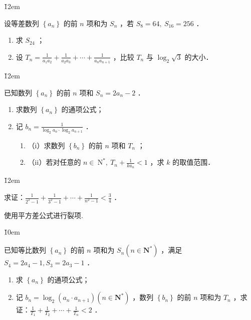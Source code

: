 \v{12em}

\begin{example}
    设等差数列 $\left\{a_n\right\}$ 的前 $n$ 项和为 $S_n$ ，若 $S_8=64, ~ S_{16}=256$ ．
    \begin{enumerate}
        \item 求 $S_{24}$ ；
        \item 设 $T_n=\frac{1}{a_1 a_2}+\frac{1}{a_2 a_3}+\cdots+\frac{1}{a_n a_{n+1}}$ ，比较 $T_n$ 与 $\log _2 \sqrt{3}$ 的大小．
    \end{enumerate}
\end{example}

\v{12em}


\begin{example}
    已知数列 $\left\{a_n\right\}$ 的前 $n$ 项和 $S_n=2 a_n-2$ ．
    \begin{enumerate}
        \item 求数列 $\left\{a_n\right\}$ 的通项公式；

        \item 记 $b_n=\frac{1}{\log _2 a_n \cdot \log _2 a_{n+1}}$ ．
              \begin{enumerate}
                  \item （i）求数列 $\left\{b_n\right\}$ 的前 $n$ 项和 $T_n$ ；
                  \item （ii）若对任意的 $n \in \mathrm{~N}^*, ~ T_n+\frac{1}{k a_n}<1$ ，求 $k$ 的取值范围．
              \end{enumerate}
    \end{enumerate}
\end{example}

\v{12em}

\begin{example}
    求证：$\frac{1}{2^2-1}+\frac{1}{3^2-1}+\cdots+\frac{1}{n^2-1}<\frac{3}{4}$ ．
\end{example}

\begin{tips}
    使用平方差公式进行裂项.
\end{tips}

\v{10em}

\begin{example}
    已知等比数列 $\left\{a_n\right\}$ 的前 $n$ 项和为 $S_n\left(n \in \mathbf{N}^*\right)$ ，满足 $S_4=2 a_4-1, S_3=2 a_3-1$ ．
    \begin{enumerate}
        \item 求 $\left\{a_n\right\}$ 的通项公式；

        \item 记 $b_n=\log _2\left(a_n \cdot a_{n+1}\right)\left(n \in \mathbf{N}^*\right)$ ，数列 $\left\{b_n\right\}$ 的前 $n$ 项和为 $T_n$ ，求证：$\frac{1}{T_1}+\frac{1}{T_2}+\cdots+\frac{1}{T_n}<2$ ．
    \end{enumerate}
\end{example}

